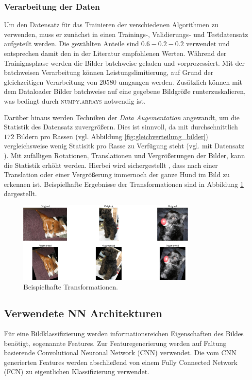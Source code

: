 \subsubsection{Verarbeitung der Daten}
Um den Datensatz für das Trainieren der verschiedenen Algorithmen zu verwenden,
muss er zunächst in einen Trainings-, Validierungs- und Testdatensatz aufgeteilt
werden. Die gewählten Anteile sind $0.6-0.2-0.2$ verwendet und entsprechen damit
den in der Literatur \cite[S. 29]{hands_on_machine_learning} empfohlenen Werten.
Während der Trainignsphase werden die Bilder batchweise geladen und vorprozessiert.
Mit der batchweisen Verarbeitung können Leistungslimitierung, auf Grund der
gleichzeitigen Verarbeitung von $20580$ umgangen werden.
Zusätzlich können mit dem Dataloader Bilder batchweise auf eine gegebene
Bildgröße runterzuskalieren, was bedingt durch \textsc{numpy.arrays}
notwendig ist.

Darüber hinaus werden Techniken der \emph{Data Augementation} angewandt, um
die Statistik des Datensatz zuvergrößern. Dies ist sinnvoll, da mit durchschnittlich
$172$ Bildern pro Rassen (vgl. Abbildung \ref{fig:gleichverteilung_bilder})
vergleichsweise wenig Statisitk pro Rasse zu
Verfügung steht (vgl. mit Datensatz \cite{google_open_image}).
Mit zufälligen Rotationen, Translationen und Vergrößerungen
der Bilder, kann die Statistik erhöht werden. Hierbei wird sichergestellt
, dass nach einer Translation oder einer Vergrößerung immernoch der ganze Hund
im Bild zu erkennen ist. Beispielhafte Ergebnisse der Transformationen sind in Abbildung
\ref{fig:data_augementation} dargestellt.
\begin{figure}
\centering
\includegraphics[width=0.8\textwidth]{../../final_data/general/data_augementation.pdf}
\caption{Beispielhafte Transformationen.}
\label{fig:data_augementation}
\end{figure}

\subsection{Verwendete NN Architekturen}\label{sec:NNarchitekturen}
Für eine Bildklassifizierung werden informationsreichen Eigenschaften
des Bildes benötigt, sogenannte Features. Zur Featuregenerierung werden auf Faltung
basierende  Convolutional Neuronal Network (CNN) verwendet.
Die vom CNN generierten Features werden abschließend von einem
Fully Connected Network (FCN) zu eigentlichen Klassifizierung verwendet.


